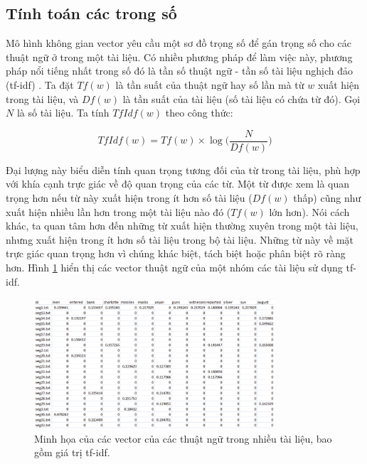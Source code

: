 \documentclass[14pt, a4paper]{article}
\numberwithin{equation}{section}
\numberwithin{figure}{section}
\numberwithin{dl}{section}
\numberwithin{md}{section}
\numberwithin{bd}{section}
\numberwithin{dn}{section}
\numberwithin{hq}{section}
\begin{document}
    \subsection{Tính toán các trong số}

    Mô hình không gian vector yêu cầu một sơ đồ trọng số để gán trọng số cho các thuật ngữ ở trong một tài liệu.
    Có nhiều phương pháp để làm việc này, phương pháp nổi tiếng nhất trong số đó là tần số thuật ngữ - tần số tài liệu nghịch đảo (tf-idf) \cite{355}.
    Ta đặt $Tf(w)$ là tần suất của thuật ngữ hay số lần mà từ $w$ xuất hiện trong tài liệu, và $Df(w)$ là tần suất của tài liệu (số tài liệu có chứa từ đó).
    Gọi $N$ là số tài liệu. Ta tính $TfIdf(w)$ theo công thức:

    \begin{equation}
        TfIdf(w) = Tf(w) \times \log \Big( \dfrac{N}{Df(w)} \Big)
    \end{equation}

    Đại lượng này biểu diễn tính quan trọng tương đối của từ trong tài liệu, phù hợp với khía cạnh trực giác về độ quan trọng của các từ.
    Một từ được xem là quan trọng hơn nếu từ này xuất hiện trong ít hơn số tài liệu ($Df(w)$ thấp) cũng như xuất hiện nhiều lần hơn trong một tài liệu nào đó ($Tf(w)$ lớn hơn).
    Nói cách khác, ta quan tâm hơn đến những từ xuất hiện thường xuyên trong một tài liệu, nhưng xuất hiện trong ít hơn số tài liệu trong bộ tài liệu.
    Những từ này về mặt trực giác quan trọng hơn vì chúng khác biệt, tách biệt hoặc phân biệt rõ ràng hơn.
    Hình \ref{fig:1} hiển thị các vector thuật ngữ của một nhóm các tài liệu sử dụng tf-idf.

    \begin{figure}[h!]
        \centering
        \includegraphics[width=0.8\textwidth]{1.png}
        \caption{Minh họa của các vector của các thuật ngữ trong nhiều tài liệu, bao gồm giá trị tf-idf.}
        \label{fig:1}
    \end{figure}
\end{document}
